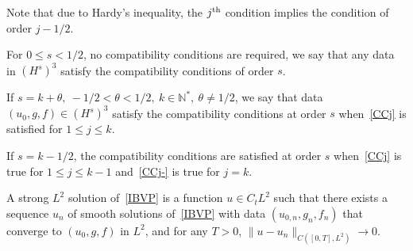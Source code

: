 \documentclass[AHL,Unicode,longabstracts,published]{cedram}
\newcommand{\N}{\mathbb{N}}
\newcommand{\N}{\mathbb{N}}
\begin{document}
Note that due to Hardy's inequality, the $j^{\rm th}$ condition implies the condition of order $j-1/2$.
\begin{defi}
For $0\leq s<1/2$, no compatibility conditions are required, we say that any data in $(H^s)^3$ satisfy the compatibility conditions of order $s$.


If $s=k+\theta,\ -1/2< \theta <1/2,\ k\in \N^*,\
\theta\neq 1/2$, we say that data $(u_0,g,f)\in (H^s)^3$ satisfy the compatibility conditions at order $s$ when~\eqref{CCj} is satisfied for $1\leq j\leq k$.


If $s=k-1/2$, the compatibility conditions are satisfied at order $s$ when~\eqref{CCj} is true for $1\leq j\leq k-1$ and~\eqref{CCj-} is true for $j=k$.
\end{defi}

A strong $L^2$ solution of~\eqref{IBVP} is a function $u\in C_tL^2$ such that there exists a sequence $u_n$ of smooth solutions of~\eqref{IBVP} with data $(u_{0,n},g_n,f_n)$ that converge to $(u_{0},g,f)$ in $L^2$, and for any $T>0$, $\|u-u_n\| _{C([0,T],L^2)}\to 0$.
\end{document}
